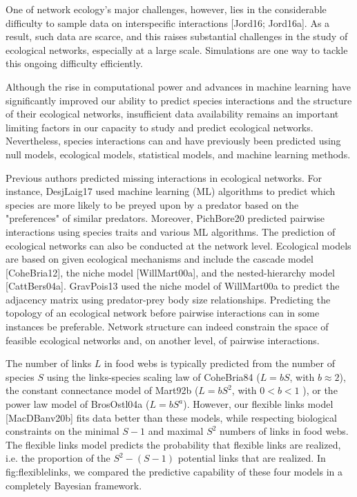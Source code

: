 One
of network ecology's major challenges, however, lies in the considerable
difficulty to sample data on interspecific interactions [Jord16; Jord16a]. As
a result, such data are scarce, and this raises substantial challenges in the
study of ecological networks, especially at a large scale. Simulations are one
way to tackle this ongoing difficulty efficiently.

Although the rise in computational power and advances in machine learning have
significantly improved our ability to predict species interactions and the
structure of their ecological networks, insufficient data availability remains
an important limiting factors in our capacity to study and predict ecological
networks. Nevertheless, species interactions can and have previously been
predicted using null models, ecological models, statistical models, and machine
learning methods.

Previous authors predicted missing interactions in ecological networks. For
instance, DesjLaig17 used machine learning (ML) algorithms to predict which
species are more likely to be preyed upon by a predator based on the
"preferences" of similar predators. Moreover, PichBore20 predicted pairwise
interactions using species traits and various ML algorithms. The prediction of
ecological networks can also be conducted at the network level. Ecological
models are based on given ecological mechanisms and include the cascade model
[CoheBria12], the niche model [WillMart00a], and the nested-hierarchy model
[CattBers04a]. GravPois13 used the niche model of WillMart00a to predict the
adjacency matrix using predator-prey body size relationships. Predicting the
topology of an ecological network before pairwise interactions can in some
instances be preferable. Network structure can indeed constrain the space of
feasible ecological networks and, on another level, of pairwise interactions.

The number of links $L$ in food webs is typically predicted from the number of
species $S$ using the links-species scaling law of CoheBria84 ($L=bS$, with
$b\approx 2$), the constant connectance model of Mart92b ($L=bS^2$, with $0 < b
< 1$ ), or the power law model of BrosOstl04a ($L=bS^a$). However, our flexible
links model [MacDBanv20b] fits data better than these models, while respecting
biological constraints on the minimal $S-1$ and maximal $S^2$ numbers of links
in food webs. The flexible links model predicts the probability that flexible
links are realized, i.e. the proportion of the $S^2 - (S-1)$ potential links
that are realized. In fig:flexiblelinks, we compared the predictive capability
of these four models in a completely Bayesian framework.  

